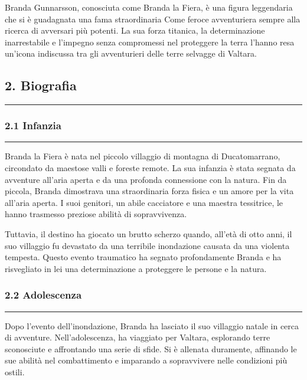 Branda Gunnarsson, conosciuta come Branda la Fiera, è una figura
leggendaria che si è guadagnata una fama straordinaria Come feroce
avventuriera sempre alla ricerca di avversari più potenti. La sua forza
titanica, la determinazione inarrestabile e l'impegno senza compromessi
nel proteggere la terra l'hanno resa un'icona indiscussa tra gli
avventurieri delle terre selvagge di Valtara.

\subsection{2. Biografia}\label{biografia}

\begin{center}\rule{0.5\linewidth}{0.5pt}\end{center}

\subsubsection{2.1 Infanzia}\label{infanzia}

\begin{center}\rule{0.5\linewidth}{0.5pt}\end{center}

Branda la Fiera è nata nel piccolo villaggio di montagna di
Ducatomarrano, circondato da maestose valli e foreste remote. La sua
infanzia è stata segnata da avventure all'aria aperta e da una profonda
connessione con la natura. Fin da piccola, Branda dimostrava una
straordinaria forza fisica e un amore per la vita all'aria aperta. I
suoi genitori, un abile cacciatore e una maestra tessitrice, le hanno
trasmesso preziose abilità di sopravvivenza.

Tuttavia, il destino ha giocato un brutto scherzo quando, all'età di
otto anni, il suo villaggio fu devastato da una terribile inondazione
causata da una violenta tempesta. Questo evento traumatico ha segnato
profondamente Branda e ha risvegliato in lei una determinazione a
proteggere le persone e la natura.

\subsubsection{2.2 Adolescenza}\label{adolescenza}

\begin{center}\rule{0.5\linewidth}{0.5pt}\end{center}

Dopo l'evento dell'inondazione, Branda ha lasciato il suo villaggio
natale in cerca di avventure. Nell'adolescenza, ha viaggiato per
Valtara, esplorando terre sconosciute e affrontando una serie di sfide.
Si è allenata duramente, affinando le sue abilità nel combattimento e
imparando a sopravvivere nelle condizioni più ostili.

